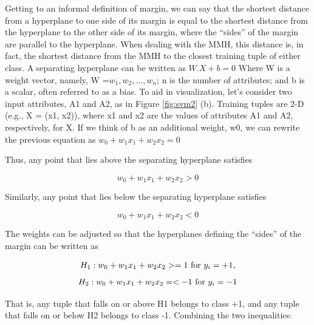 \documentclass[12pt,fleqn]{book} %
\begin{document}
Getting to an informal definition of margin, we can say that the shortest distance from a hyperplane to one side of its margin is equal to the shortest distance from the hyperplane to the other side of its margin, where the “sides” of the margin are parallel to the hyperplane. When dealing with the MMH, this distance is, in fact, the shortest distance from the MMH to the closest training tuple of either class. A separating hyperplane can be written as $W.X+b = 0 $ Where W is a weight vector, namely, W =${  w_1,w_2,…,w_n }$; n is the number of attributes; and b is a scalar, often referred to as a bias. To aid in visualization, let’s consider two input attributes, A1 and A2, as in Figure \ref{fig:svm2} (b). Training tuples are 2-D (e.g., X = (x1, x2)), where x1 and x2 are the values of attributes A1 and A2, respectively, for X. If we think of b as an additional weight, w0, we can rewrite the previous equation as $w_{0} + w_{1} x_{1}+w_{2} x_{2}=0$ \bigskip

Thus, any point that lies above the separating hyperplane satisfies

\begin{dBox}
\begin{equation}
w_0 + w_1 x_1 + w_2  x_2 > 0 
\end{equation}
\end{dBox}

Similarly, any point that lies below the separating hyperplane satisfies

\begin{dBox}
\begin{equation}
w_0 + w_1 x_1 + w_2  x_2 < 0 
\end{equation}
\end{dBox}

The weights can be adjusted so that the hyperplanes defining the “sides” of the margin can be written as

\begin{dBox}
\begin{equation}
H_1: w_0 + w_1 x_1 + w_2 x_2 >= 1    $ for $  y_i = +1,
\end{equation}
\begin{equation}
H_2: w_0 + w_1 x_1 + w_2 x_2 =< -1    $ for $ y_i = -1
\end{equation}
\end{dBox}

That is, any tuple that falls on or above H1 belongs to class +1, and any tuple that falls on or below H2 belongs to class -1. Combining the two inequalities:
\end{document}
